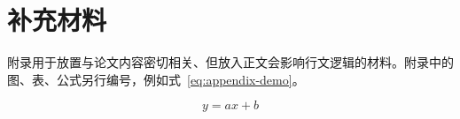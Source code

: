 \chapter{补充材料}

附录用于放置与论文内容密切相关、但放入正文会影响行文逻辑的材料。附录中的图、表、公式另行编号，例如式~\eqref{eq:appendix-demo}。

\begin{equation}
  y = ax + b
  \label{eq:appendix-demo}
\end{equation}
